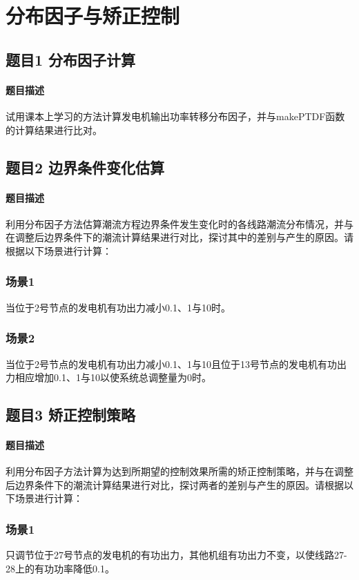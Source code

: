 \documentclass[a4paper,12pt]{article}
\begin{document}
    \section{分布因子与矫正控制}
    \subsection{题目1 分布因子计算}
    \paragraph{题目描述} 试用课本上学习的方法计算发电机输出功率转移分布因子，并与makePTDF函数的计算结果进行比对。

    \subsection{题目2 边界条件变化估算}
    \paragraph{题目描述} 利用分布因子方法估算潮流方程边界条件发生变化时的各线路潮流分布情况，并与在调整后边界条件下的潮流计算结果进行对比，探讨其中的差别与产生的原因。请根据以下场景进行计算：
    \subsubsection{场景1} 当位于2号节点的发电机有功出力减小0.1、1与10时。
    \subsubsection{场景2} 当位于2号节点的发电机有功出力减小0.1、1与10且位于13号节点的发电机有功出力相应增加0.1、1与10以使系统总调整量为0时。

    \subsection{题目3 矫正控制策略}
    \paragraph{题目描述} 利用分布因子方法计算为达到所期望的控制效果所需的矫正控制策略，并与在调整后边界条件下的潮流计算结果进行对比，探讨两者的差别与产生的原因。请根据以下场景进行计算：
    \subsubsection{场景1} 只调节位于27号节点的发电机的有功出力，其他机组有功出力不变，以使线路27-28上的有功功率降低0.1。
\end{document}
